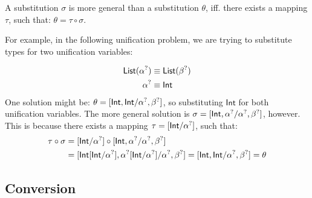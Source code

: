 \documentclass[twoside,12pt,a4paper]{article}
\begin{document}
\begin{definition} 
    A substitution $\sigma$ is more general than a substitution $\theta$, iff. there exists a mapping $\tau$, such that: $\theta = \tau \circ \sigma$.
\end{definition} %

For example, in the following unification problem, we are trying to substitute types for two unification variables:
\begin{example}
    \begin{align*}
        \mathsf{List}(\alpha^?) &\equiv \mathsf{List}(\beta^?)\\
        \alpha^? &\equiv \mathsf{Int}
    \end{align*}
    One solution might be: $\theta = [\mathsf{Int, Int / \alpha^?, \beta^?}]$, 
so substituting $\mathsf{Int}$ for both unification variables.
The more general solution is $\sigma = [\mathsf{Int,\alpha^? / \alpha^?, \beta^?}]$, however.
This is because there exists a mapping $\tau = [\mathsf{Int / \alpha^?}]$, such that:
\begin{align*}
    \tau \circ \sigma &= [\mathsf{Int / \alpha^?}]\circ[\mathsf{Int,\alpha^? / \alpha^?, \beta^?}] \\
    &= [\mathsf{Int[Int/\alpha^?], \alpha^?[Int/\alpha^?] / \alpha^?, \beta^?]= [Int, Int / \alpha^?, \beta^?]= \theta}
\end{align*}    
\end{example}

\subsection{Conversion}
\end{document}
